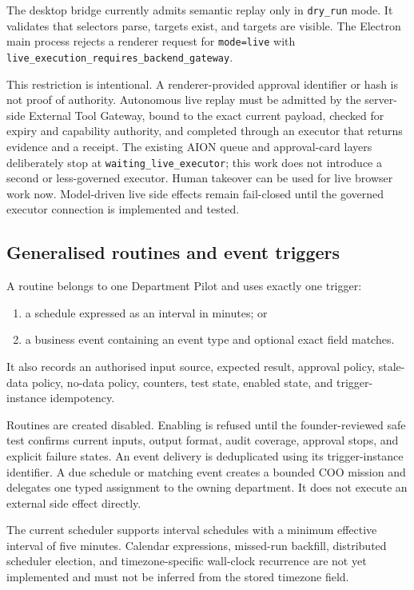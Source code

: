 The desktop bridge currently admits semantic replay only in
\texttt{dry\_run} mode.  It validates that selectors parse, targets exist, and
targets are visible.  The Electron main process rejects a renderer request for
\texttt{mode=live} with
\texttt{live\_execution\_requires\_backend\_gateway}.

This restriction is intentional.  A renderer-provided approval identifier or
hash is not proof of authority.  Autonomous live replay must be admitted by the
server-side External Tool Gateway, bound to the exact current payload, checked
for expiry and capability authority, and completed through an executor that
returns evidence and a receipt.  The existing AION queue and approval-card
layers deliberately stop at \texttt{waiting\_live\_executor}; this work does
not introduce a second or less-governed executor.  Human takeover can be used
for live browser work now.  Model-driven live side effects remain fail-closed
until the governed executor connection is implemented and tested.

\subsection{Generalised routines and event triggers}

A routine belongs to one Department Pilot and uses exactly one trigger:
\begin{enumerate}[leftmargin=*]
\item a schedule expressed as an interval in minutes; or
\item a business event containing an event type and optional exact field
matches.
\end{enumerate}
It also records an authorised input source, expected result, approval policy,
stale-data policy, no-data policy, counters, test state, enabled state, and
trigger-instance idempotency.

Routines are created disabled.  Enabling is refused until the founder-reviewed
safe test confirms current inputs, output format, audit coverage, approval
stops, and explicit failure states.  An event delivery is deduplicated using
its trigger-instance identifier.  A due schedule or matching event creates a
bounded COO mission and delegates one typed assignment to the owning
department.  It does not execute an external side effect directly.

The current scheduler supports interval schedules with a minimum effective
interval of five minutes.  Calendar expressions, missed-run backfill,
distributed scheduler election, and timezone-specific wall-clock recurrence
are not yet implemented and must not be inferred from the stored timezone
field.

